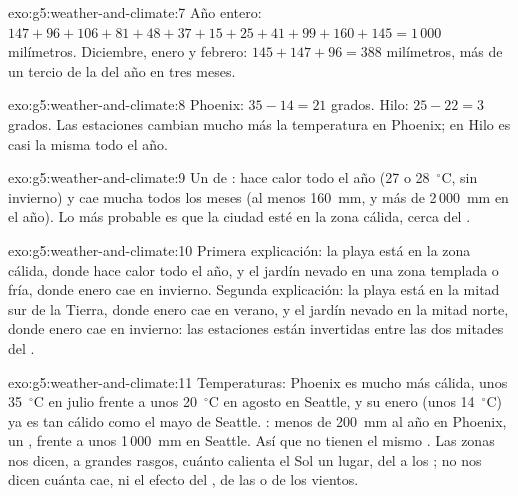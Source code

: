 \begin{solution}{exo:g5:weather-and-climate:7}
Año entero: $147 + 96 + 106 + 81 + 48 + 37 + 15 + 25 + 41 + 99 + 160 + 145
= 1\,000$ milímetros. Diciembre, enero y febrero:
$145 + 147 + 96 = 388$ milímetros, más de un tercio de la  del año en
tres meses.
\end{solution}

\begin{solution}{exo:g5:weather-and-climate:8}
Phoenix: $35 - 14 = 21$ grados. Hilo: $25 - 22 = 3$ grados. Las estaciones
cambian mucho más la temperatura en Phoenix; en Hilo es casi la misma todo
el año.
\end{solution}

\begin{solution}{exo:g5:weather-and-climate:9}
Un  de : hace calor todo el año (27 o 28~$^\circ$C, sin
invierno) y cae mucha  todos los meses (al menos 160~mm, y más de
2\,000~mm en el año). Lo más probable es que la ciudad esté en la zona
cálida, cerca del .
\end{solution}

\begin{solution}{exo:g5:weather-and-climate:10}
Primera explicación: la playa está en la zona cálida, donde hace calor todo
el año, y el jardín nevado en una zona templada o fría, donde enero cae en
invierno. Segunda explicación: la playa está en la mitad sur de la Tierra,
donde enero cae en verano, y el jardín nevado en la mitad norte, donde enero
cae en invierno: las estaciones están invertidas entre las dos mitades del
.
\end{solution}

\begin{solution}{exo:g5:weather-and-climate:11}
Temperaturas: Phoenix es mucho más cálida, unos 35~$^\circ$C en julio
frente a unos 20~$^\circ$C en agosto en Seattle, y su enero (unos
14~$^\circ$C) ya es tan cálido como el mayo de Seattle. : menos de
200~mm al año en Phoenix, un , frente a unos 1\,000~mm en Seattle.
Así que no tienen el mismo . Las zonas nos dicen, a grandes rasgos,
cuánto calienta el Sol un lugar, del  a los ; no nos dicen
cuánta  cae, ni el efecto del , de las  o de los vientos.
\end{solution}
